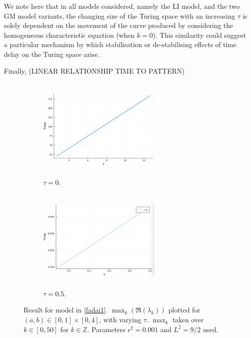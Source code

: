 We note here that in all models considered, namely the LI model, and the two GM model variants, the changing size of the Turing space with an increasing $\tau$ is solely dependent on the movement of the curve produced by considering the homogeneous characteristic equation (when $k=0$). This similarity could suggest a particular mechanism by which stabilisation or de-stabilising effects of time delay on the Turing space arise.

Finally, (LINEAR RELATIONSHIP TIME TO PATTERN)

\begin{figure}[H]
    \centering
    \begin{subfigure}[t]{0.45\textwidth}
        \centering
        \includegraphics[width=6cm,height = 5cm]{gmlin1.png}
        \caption{$\tau=0$.}
        \label{}
    \end{subfigure}
    \hfill
    \begin{subfigure}[t]{0.45\textwidth}
        \centering
        \includegraphics[width=6cm,height = 5cm]{fad2lin.png}
        \caption{$\tau=0.5$.}
        \label{f}
    \end{subfigure}
    \caption{Result for model in \eqref{fadai1}. $\max_k(\Re(\lambda_k))$ plotted for $(a,b)\in[0,1]\times[0,4]$, with varying $\tau$. $\max_k$ taken over $k\in[0,50]$ for $k\in\mathbb{Z}$. Parameters $\epsilon^2=0.001$ and $L^2=9/2$ used.}
    \label{fig:fad1}
\end{figure}
